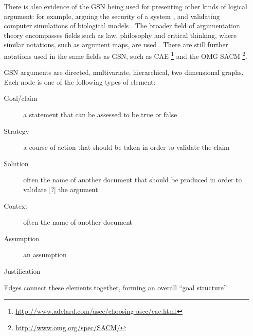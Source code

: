 There is also evidence of the GSN being used for presenting other kinds of logical argument:
for example,
arguing the security of a system \cite{plop},
and validating computer simulations of biological models \cite{insilico,royal}.
The broader field of argumentation theory encompasses fields such as law, philosophy and critical thinking, where similar notations, such as argument maps, are used \citep[pp.~3--6]{open1}.
There are still further notations used in the same fields as GSN, such as CAE
\footnote{\url{http://www.adelard.com/asce/choosing-asce/cae.html}}
and the OMG SACM
\footnote{\url{http://www.omg.org/spec/SACM/}}.

GSN arguments are directed, multivariate, hierarchical, two dimensional graphs.
Each node is one of the following types of element:

\begin{description}

  \item[ Goal/claim ]
    a statement that can be assessed to be true or false

  \item[ Strategy]
    a course of action that should be taken in order to validate the claim
  
  \item[ Solution]
      often the name of another document that should be produced in order to validate [?] the argument 

  \item[ Context]
    often the name of another document

  \item[ Assumption]
    an assumption

  \item[ Justification]

\end{description}

Edges connect these elements together, forming an overall ``goal structure''. 

